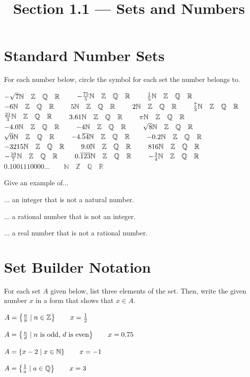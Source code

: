 

\title{Section 1.1 --- Sets and Numbers}

\newcommand{\sets}{\ensuremath{\mathbb{N}\quad\mathbb{Z}\quad\mathbb{Q}\quad\mathbb{R}}}
\newcommand{\picksets}[1]{$#1\hfill\sets\qquad$}


\maketitle

\section*{Standard Number Sets}
For each number below, circle the symbol for each set the number belongs to.
\begin{smenum}
\mitemxxx
    {\picksets{-\sqrt{7}}}
    {\picksets{-\frac{75}{5}}}
    {\picksets{\frac{1}{5}}}
\mitemxxx
    {\picksets{-6}}
    {\picksets{5}}
    {\picksets{2}}
\mitemxxx
    {\picksets{\frac{7}{3}}}
    {\picksets{\frac{21}{3}}}
    {\picksets{3.61}}
\mitemxxx
    {\picksets{\pi}}
    {\picksets{-4.0}}
    {\picksets{-4}}
\mitemxxx
    {\picksets{\sqrt{8}}}
    {\picksets{\sqrt{9}}}
    {\picksets{-4.\overline{54}}}
\mitemxxx
    {\picksets{-0.2}}
    {\picksets{-3215}}
    {\picksets{9.0}}
\mitemxxx
    {\picksets{816}}
    {\picksets{-\frac{10}{7}}}
    {\picksets{0.\overline{123}}}
\mitemxxo
    {\picksets{-\frac{3}{4}}}
    {$0.1001110000...\qquad\sets$}
\end{smenum}
Give an example of...
\begin{senum}
\item ... an integer that is not a natural number.
\item ... a rational number that is not an integer.
\item ... a real number that is not a rational number.
\end{senum}

\section*{Set Builder Notation}
For each set $A$ given below, list three elements of the set. Then, write the given number $x$ in a form that shows that $x\in A$.
\begin{senum}
\item $A=\left\{\frac{n}{8}\mid n\in\mathbb{Z}\right\}\qquad x=\frac{1}{2}$
\item $A=\left\{\frac{n}{d}\mid \mbox{$n$ is odd, $d$ is even}\right\}\qquad x=0.75$
\item $A=\left\{x-2\mid x\in\mathbb{N}\right\}\qquad x=-1$
\item $A=\left\{\frac{1}{a}\mid a\in\mathbb{Q}\right\}\qquad x=3$
\end{senum}

